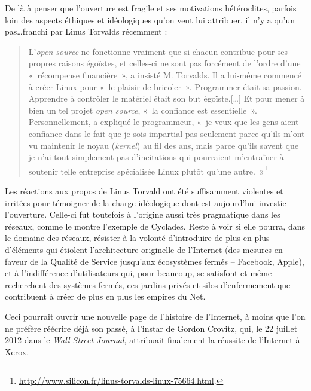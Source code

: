 \documentclass{FramateX}
\begin{document}
\begin{refsection}
De là à penser que l'ouverture est fragile et ses
motivations hétéroclites, parfois loin des aspects éthiques et
idéologiques qu'on veut lui attribuer, il
n'y a qu'un pas\ldots franchi par Linus
Torvalds récemment : 

\begin{quote}

L'\textit{open source} ne fonctionne vraiment que si
chacun contribue pour ses propres raisons égoïstes, et celles-ci ne
sont pas forcément de l'ordre d'une
«~récompense financière~», a insisté M. Torvalds. Il a lui-même
commencé à créer Linux pour «~le plaisir de bricoler~». Programmer
était sa passion. Apprendre à contrôler le matériel était son but
égoïste.[\ldots] Et pour mener à bien un tel projet \textit{open source},
«~la confiance est essentielle~». Personnellement, a expliqué le
programmeur, «~je veux que les gens aient confiance dans le fait que je
sois impartial pas seulement parce qu'ils
m'ont vu maintenir le noyau (\textit{kernel}) au fil
des ans, mais parce qu'ils savent que je
n'ai tout simplement pas
d'incitations qui pourraient
m'entraîner à soutenir telle entreprise spécialisée
Linux plutôt qu'une
autre.~»\footnote{\url{http://www.silicon.fr/linus-torvalds-linux-75664.html}.}

\end{quote}

Les réactions aux propos de Linus Torvald ont été suffisamment violentes
et irritées pour témoigner de la charge idéologique dont est
aujourd'hui investie l'ouverture.
Celle-ci fut toutefois à l'origine aussi très
pragmatique dans les réseaux, comme le montre
l'exemple de Cyclades. Reste à voir si elle pourra,
dans le domaine des réseaux, résister à la volonté
d'introduire de plus en plus
d'éléments qui étiolent
l'architecture originelle de
l'Internet (des mesures en faveur de la Qualité de
Service jusqu'aux écosystèmes fermés – Facebook,
Apple), et à l'indifférence
d'utilisateurs qui, pour beaucoup, se satisfont et
même recherchent des systèmes fermés, ces jardins privés et silos
d'enfermement que contribuent à créer de plus en plus
les empires du Net. 

Ceci pourrait ouvrir une nouvelle page de l'histoire de
l'Internet, à moins que l'on ne
préfère réécrire déjà son passé, à l'instar de Gordon Crovitz, qui, le 22 juillet 2012
dans le \textit{Wall Street Journal}, attribuait finalement la réussite de l'Internet à Xerox. 


\end{refsection}
\end{document}

